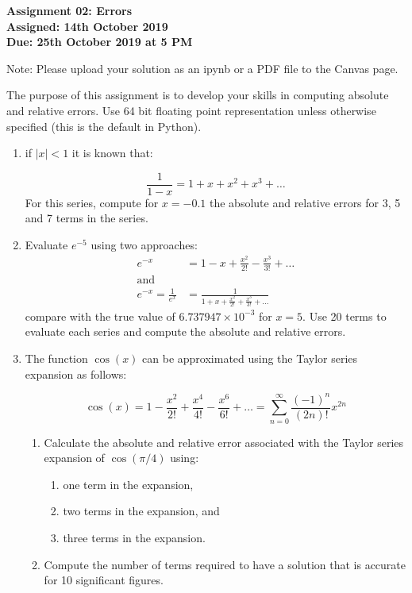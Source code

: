 \documentclass[a4paper,12pt]{article}
\begin{document}
\begin{centering}
	\textbf{
		Assignment 02: Errors\\
		Assigned: 14th October 2019\\
		Due: 25th October 2019 at 5 PM\\
	}
\end{centering}


Note: Please upload your solution as an ipynb or a PDF file to the Canvas page.

\vspace{1em}
 
 The purpose of this assignment is to develop your skills in computing absolute and relative errors. Use 64 bit floating point representation unless otherwise specified (this is the default in Python).
 
\begin{enumerate}
	
	\item if $\vert x \vert < 1$ it is known that:
	
	\begin{equation*}
	\frac{1}{1 - x} = 1 + x + x^2 + x^3 + \dots
	\end{equation*}
	For this series, compute for $x = -0.1$ the absolute and relative errors for 3, 5 and 7 terms in the series. 
	
	\item Evaluate $e^{-5}$ using two approaches:
		\begin{align*}
			e^{-x} &  = 1 - x + \frac{x^2}{2!} - \frac{x^3}{3!} + \dots \\
			\mathrm{and}\\
			e^{-x} = \frac{1}{e^x} & = \frac{1}{1 + x + \frac{x^2}{2!} + \frac{x^3}{3!} + \dots} 
		\end{align*}
		compare with the true value of $6.737947 \times 10^{-3}$ for $x = 5$. Use 20 terms to evaluate each series and compute the absolute and relative errors.
		
	\item The function $\cos(x)$ can be approximated using the Taylor series expansion as follows:
	
		\begin{equation*}
		\cos(x) = 1 - \frac{x^2}{2!} + \frac{x^4}{4!} - \frac{x^6}{6!}+ \dots = \sum_{n = 0}^{\infty}\frac{(-1)^n}{(2n)!}x^{2n}
		\end{equation*}
	\begin{enumerate}
	\item Calculate the absolute and relative error associated with the Taylor series expansion of $\cos(\pi/4)$ using:
		\begin{enumerate}
			\item one term in the expansion,
			\item two terms in the expansion, and
			\item three terms in the expansion.
		\end{enumerate}
	\item Compute the number of terms required to have a solution that is accurate for 10 significant figures.		
	\end{enumerate}


\end{enumerate}
\end{document}
